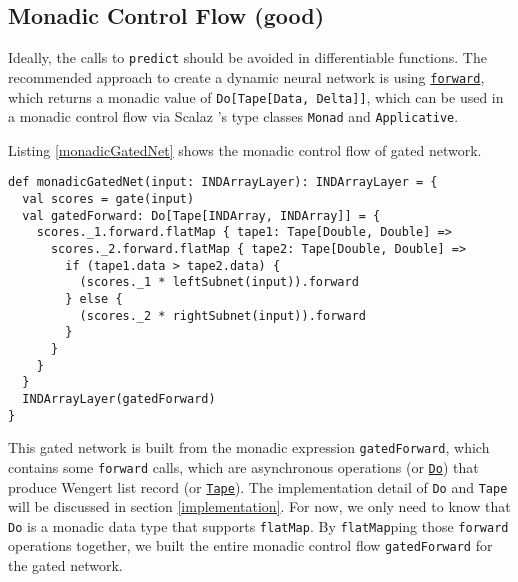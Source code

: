 \subsection{Monadic Control Flow (good)\label{monadic}}

Ideally, the calls to \lstinline{predict} should be avoided in differentiable functions. The recommended approach to create a dynamic neural network is using \href{https://javadoc.io/page/com.thoughtworks.deeplearning/deeplearning_2.11/latest/com/thoughtworks/deeplearning/DeepLearning.html\#forward(differentiable:Differentiable):com.thoughtworks.raii.asynchronous.Do[com.thoughtworks.deeplearning.DeepLearning.Tape[DeepLearning.this.Data,DeepLearning.this.Delta]]}{\lstinline{forward}}, which returns a monadic value of \lstinline{Do[Tape[Data, Delta]]}, which can be used in a monadic control flow via Scalaz \cite{kenji2017scalaz}'s type classes \cite{oliveira2010type} \lstinline{Monad} and \lstinline{Applicative}.

Listing \ref{monadicGatedNet} shows the monadic control flow of gated network.

\begin{lstlisting}[float={htbp},caption={Monadic gated network}, label={monadicGatedNet}]
def monadicGatedNet(input: INDArrayLayer): INDArrayLayer = {
  val scores = gate(input)
  val gatedForward: Do[Tape[INDArray, INDArray]] = {
    scores._1.forward.flatMap { tape1: Tape[Double, Double] =>
      scores._2.forward.flatMap { tape2: Tape[Double, Double] =>
        if (tape1.data > tape2.data) {
          (scores._1 * leftSubnet(input)).forward
        } else {
          (scores._2 * rightSubnet(input)).forward
        }
      }
    }
  }
  INDArrayLayer(gatedForward)
}
\end{lstlisting}

This gated network is built from the monadic expression \lstinline{gatedForward}, which contains some \lstinline{forward} calls, which are asynchronous operations (or \href{https://javadoc.io/page/com.thoughtworks.raii/asynchronous_2.11/latest/com/thoughtworks/raii/asynchronous$$Do.html}{\lstinline{Do}}) that produce Wengert list record (or \href{https://javadoc.io/page/com.thoughtworks.deeplearning/deeplearning_2.11/latest/com/thoughtworks/deeplearning/DeepLearning$$Tape.html}{\lstinline{Tape}}). The implementation detail of \lstinline{Do} and \lstinline{Tape} will be discussed in section \ref{implementation}. For now, we only need to know that \lstinline{Do} is a monadic data type that supports \lstinline{flatMap}. By \lstinline{flatMap}ping those \lstinline{forward} operations together, we built the entire monadic control flow \lstinline{gatedForward} for the gated network.

